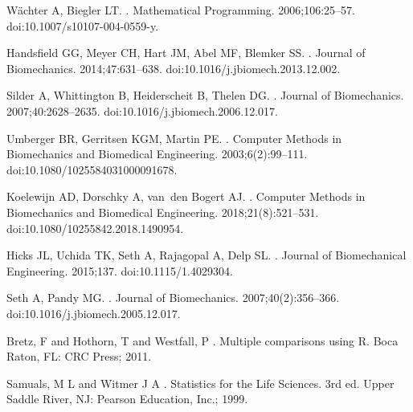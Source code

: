 \documentclass[10pt,letterpaper]{article}
\begin{document}
\begin{thebibliography}{10}
W{\"a}chter A, Biegler LT.
.
\newblock Mathematical Programming. 2006;106:25--57.
\newblock doi:{10.1007/s10107-004-0559-y}.

Handsfield GG, Meyer CH, Hart JM, Abel MF, Blemker SS.
.
\newblock Journal of Biomechanics. 2014;47:631--638.
\newblock doi:{10.1016/j.jbiomech.2013.12.002}.

Silder A, Whittington B, Heiderscheit B, Thelen DG.
.
\newblock Journal of Biomechanics. 2007;40:2628--2635.
\newblock doi:{10.1016/j.jbiomech.2006.12.017}.

Umberger BR, Gerritsen KGM, Martin PE.
.
\newblock Computer Methods in Biomechanics and Biomedical Engineering.
  2003;6(2):99--111.
\newblock doi:{10.1080/1025584031000091678}.

Koelewijn AD, Dorschky A, van~den Bogert AJ.
.
\newblock Computer Methods in Biomechanics and Biomedical Engineering.
  2018;21(8):521--531.
\newblock doi:{10.1080/10255842.2018.1490954}.

Hicks JL, Uchida TK, Seth A, Rajagopal A, Delp SL.
.
\newblock Journal of Biomechanical Engineering. 2015;137.
\newblock doi:{10.1115/1.4029304}.

Seth A, Pandy MG.
.
\newblock Journal of Biomechanics. 2007;40(2):356--366.
\newblock doi:{10.1016/j.jbiomech.2005.12.017}.

{Bretz, F  and Hothorn, T  and Westfall, P }.
\newblock Multiple comparisons using R.
\newblock Boca Raton, FL: CRC Press; 2011.

{Samuals, M L  and Witmer J A }.
\newblock Statistics for the Life Sciences.
\newblock 3rd ed. Upper Saddle River, NJ: Pearson Education, Inc.; 1999.


\end{thebibliography}
\end{document}

